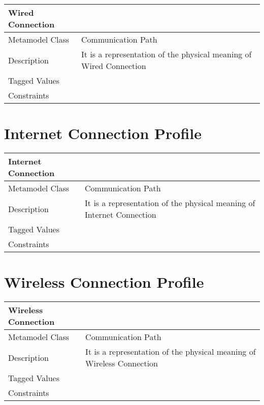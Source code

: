 \begin{longtable}{|p{4cm}|p{9cm}|}

\hline
\textbf{Wired Connection} & \\


\hline
Metamodel Class & Communication Path\\

\hline
Description & It is a representation of the physical meaning of Wired Connection\\

\hline
Tagged Values & \\

\hline
Constraints &\\

\hline
\end{longtable}
  
\section{Internet Connection Profile}

\begin{longtable}{|p{4cm}|p{9cm}|}

\hline
\textbf{Internet Connection} & \\


\hline
Metamodel Class & Communication Path\\

\hline
Description & It is a representation of the physical meaning of Internet Connection\\

\hline
Tagged Values & \\

\hline
Constraints &\\

\hline
\end{longtable}

\section{Wireless Connection Profile}

\begin{longtable}{|p{4cm}|p{9cm}|}

\hline
\textbf{Wireless Connection} & \\


\hline
Metamodel Class & Communication Path\\

\hline
Description & It is a representation of the physical meaning of Wireless Connection\\

\hline
Tagged Values & \\

\hline
Constraints &\\

\hline
\end{longtable}

